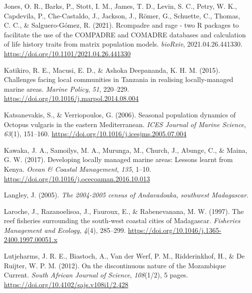 \documentclass[
]{article}
\newlength{\cslhangindent}
\newlength{\cslentryspacingunit} %
\newenvironment{CSLReferences}[2] %
 {%
  \setlength{\parindent}{0pt}
  \ifodd #1
  \let\oldpar\par
  \def\par{\hangindent=\cslhangindent\oldpar}
  \fi
  \setlength{\parskip}{#2\cslentryspacingunit}
 }%
 {}
\begin{document}
\begin{CSLReferences}{1}{2}
\leavevmode{}%
Jones, O. R., Barks, P., Stott, I. M., James, T. D., Levin, S. C., Petry, W. K., Capdevila, P., Che-Castaldo, J., Jackson, J., Römer, G., Schuette, C., Thomas, C. C., \& Salguero-Gómez, R. (2021). Rcompadre and rage - two {R} packages to facilitate the use of the {COMPADRE} and {COMADRE} databases and calculation of life history traits from matrix population models. \emph{bioRxiv}, 2021.04.26.441330. \url{https://doi.org/10.1101/2021.04.26.441330}

\leavevmode{}%
Katikiro, R. E., Macusi, E. D., \& Ashoka Deepananda, K. H. M. (2015). Challenges facing local communities in {Tanzania} in realising locally-managed marine areas. \emph{Marine Policy}, \emph{51}, 220--229. \url{https://doi.org/10.1016/j.marpol.2014.08.004}

\leavevmode{}%
Katsanevakis, S., \& Verriopoulos, G. (2006). Seasonal population dynamics of {Octopus} vulgaris in the eastern {Mediterranean}. \emph{ICES Journal of Marine Science}, \emph{63}(1), 151--160. \url{https://doi.org/10.1016/j.icesjms.2005.07.004}

\leavevmode{}%
Kawaka, J. A., Samoilys, M. A., Murunga, M., Church, J., Abunge, C., \& Maina, G. W. (2017). Developing locally managed marine areas: {Lessons} learnt from {Kenya}. \emph{Ocean \& Coastal Management}, \emph{135}, 1--10. \url{https://doi.org/10.1016/j.ocecoaman.2016.10.013}

\leavevmode{}%
Langley, J. (2005). \emph{The 2004-2005 census of {Andavadoaka}, southwest {Madagascar}}.

\leavevmode{}%
Laroche, J., Razanoelisoa, J., Fauroux, E., \& Rabenevanana, M. W. (1997). The reef fisheries surrounding the south‐west coastal cities of {Madagascar}. \emph{Fisheries Management and Ecology}, \emph{4}(4), 285--299. \url{https://doi.org/10.1046/j.1365-2400.1997.00051.x}

\leavevmode{}%
Lutjeharms, J. R. E., Biastoch, A., Van der Werf, P. M., Ridderinkhof, H., \& De Ruijter, W. P. M. (2012). On the discontinuous nature of the {Mozambique} {Current}. \emph{South African Journal of Science}, \emph{108}(1/2), 5 pages. \url{https://doi.org/10.4102/sajs.v108i1/2.428}


\end{CSLReferences}
\end{document}

